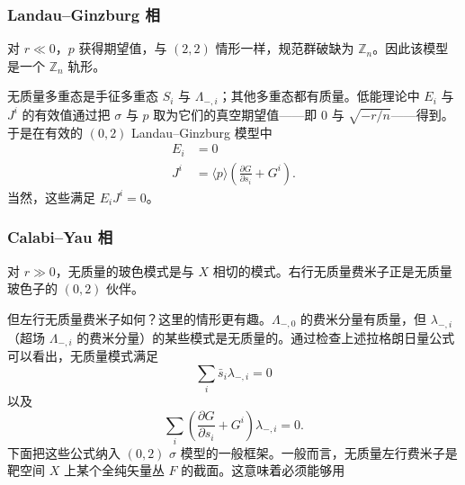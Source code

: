 \label{op:84}
\subsubsection*{Landau--Ginzburg 相}

对 $r\ll0$，$p$ 获得期望值，与 $(2,2)$ 情形一样，规范群破缺为 $\mathbb{Z}_n$。因此该模型是一个 $\mathbb{Z}_n$ 轨形。

无质量多重态是手征多重态 $S_i$ 与 $\Lambda_{-,i}$；其他多重态都有质量。低能理论中 $E_i$ 与 $J^i$ 的有效值通过把 $\sigma$ 与 $p$ 取为它们的真空期望值——即 0 与 $\sqrt{-r/n}$——得到。于是在有效的 $(0,2)$ Landau--Ginzburg 模型中
\begin{equation}\tag{6.42}
\begin{aligned}
E_i&=0\\
J^i&=\langle p\rangle\left(\frac{\partial G}{\partial s_i}+G^i\right).
\end{aligned}
\end{equation}
当然，这些满足 $E_iJ^i=0$。


\subsubsection*{Calabi--Yau 相}

对 $r\gg0$，无质量的玻色模式是与 $X$ 相切的模式。右行无质量费米子正是无质量玻色子的 $(0,2)$ 伙伴。

但左行无质量费米子如何？这里的情形更有趣。$\Lambda_{-,0}$ 的费米分量有质量，但 $\lambda_{-,i}$（超场 $\Lambda_{-,i}$ 的费米分量）的某些模式是无质量的。通过检查上述拉格朗日量公式可以看出，无质量模式满足
\begin{equation}\tag{6.43}
\sum_i\bar s_i\lambda_{-,i}=0
\end{equation}
以及
\begin{equation}\tag{6.44}
\sum_i\left(\frac{\partial G}{\partial s_i}+G^i\right)\lambda_{-,i}=0.
\end{equation}
下面把这些公式纳入 $(0,2)$ $\sigma$ 模型的一般框架。一般而言，无质量左行费米子是靶空间 $X$ 上某个全纯矢量丛 $F$ 的截面。这意味着必须能够用

